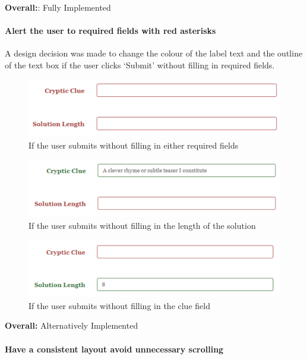 {\bf Overall:}: Fully Implemented


\paragraph{Alert the user to required fields with red asterisks}    

A design decision was made to change the colour of the label text  and the
outline of the text box if the user clicks `Submit' without filling in  required
fields.

\begin{figure}[H]
	\centering
	\includegraphics[keepaspectratio=true]{evidence/alert1.png}
	\caption{If the user submits without filling in either required fields}
\end{figure}

\begin{figure}[H]
	\centering
	\includegraphics[keepaspectratio=true]{evidence/alert2.png}
	\caption{If the user submits without filling in the length of the solution}
\end{figure}

\begin{figure}[H]
	\centering
	\includegraphics[keepaspectratio=true]{evidence/alert3.png}
	\caption{If the user submits without filling in the clue field}
\end{figure}

{\bf Overall:} Alternatively Implemented


\paragraph{Have a consistent layout avoid unnecessary scrolling}

